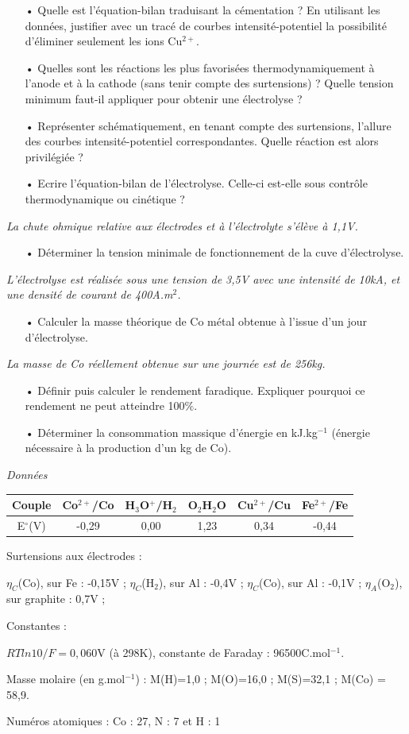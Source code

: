 \documentclass{report}
\begin{document}
\begin{itemize}
	\item[•] Quelle est l'équation-bilan traduisant la cémentation ? En utilisant les données, justifier avec un tracé de courbes intensité-potentiel la possibilité d'éliminer seulement les ions Cu$^{2+}$. 
	\item[•] Quelles sont les réactions les plus favorisées thermodynamiquement à l'anode et à la cathode (sans tenir compte des surtensions) ? Quelle tension minimum faut-il appliquer pour obtenir une électrolyse ? 
	\item[•] Représenter schématiquement, en tenant compte des surtensions, l'allure des courbes intensité-potentiel correspondantes. Quelle réaction est alors privilégiée ?
	\item[•] Ecrire l'équation-bilan de l'électrolyse. Celle-ci est-elle sous contrôle thermodynamique ou cinétique ?
\end{itemize}
\textit{La chute ohmique relative aux électrodes et à l'électrolyte s'élève à 1,1V.}
\begin{itemize}
	\item[•] Déterminer la tension minimale de fonctionnement de la cuve d'électrolyse. 
\end{itemize}
\textit{L'électrolyse est réalisée sous une tension de 3,5V avec une intensité de 10kA, et une densité de courant de 400A.m$^2$.}
\begin{itemize}
	\item[•] Calculer la masse théorique de Co métal obtenue à l'issue d'un jour d'électrolyse. 
\end{itemize}
\textit{La masse de Co réellement obtenue sur une journée est de 256kg.}
\begin{itemize}
	\item[•] Définir puis calculer le rendement faradique. Expliquer pourquoi ce rendement ne peut atteindre 100$\%$.
	\item[•] Déterminer la consommation massique d'énergie en kJ.kg$^{-1}$ (énergie nécessaire à la production d'un kg de Co).
\end{itemize}

\textit{Données}

\vspace{0,2cm}
\begin{tabular}{|c|c|c|c|c|c|}
\hline
Couple & Co$^{2+}$/Co &  H$_3$O$^{+}$/H$_2$ & O$_2$H$_2$O & Cu$^{2+}$/Cu & Fe$^{2+}$/Fe\\
\hline
E$^\circ$(V) & -0,29 & 0,00 & 1,23 & 0,34 & -0,44\\
\hline
\end{tabular}

Surtensions aux électrodes : 

$\eta_C$(Co), sur Fe : -0,15V ;
$\eta_C$(H$_2$), sur Al : -0,4V ;
$\eta_C$(Co), sur Al : -0,1V ;
$\eta_A$(O$_2$), sur graphite : 0,7V ;

Constantes : 

$RTln10/F=0,060$V (à 298K), constante de Faraday : 96500C.mol$^{-1}$.

Masse molaire (en g.mol$^{-1}$) : M(H)=1,0 ; M(O)=16,0 ; M(S)=32,1 ; M(Co) = 58,9. 

Numéros atomiques : Co : 27, N : 7 et H : 1
\end{document}
